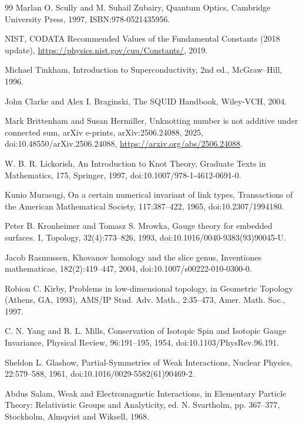 \begin{thebibliography}{99}
     Marlan O. Scully and M. Suhail Zubairy, Quantum Optics, Cambridge University Press, 1997, ISBN:978-0521435956.

     NIST, CODATA Recommended Values of the Fundamental Constants (2018 update), \url{https://physics.nist.gov/cuu/Constants/}, 2019.

     Michael Tinkham, Introduction to Superconductivity, 2nd ed., McGraw–Hill, 1996.

     John Clarke and Alex I. Braginski, The SQUID Handbook, Wiley-VCH, 2004.

     Mark Brittenham and Susan Hermiller, Unknotting number is not additive under connected sum, arXiv e-prints, arXiv:2506.24088, 2025, doi:10.48550/arXiv.2506.24088, \url{https://arxiv.org/abs/2506.24088}.

     W. B. R. Lickorish, An Introduction to Knot Theory, Graduate Texts in Mathematics, 175, Springer, 1997, doi:10.1007/978-1-4612-0691-0.

     Kunio Murasugi, On a certain numerical invariant of link types, Transactions of the American Mathematical Society, 117:387--422, 1965, doi:10.2307/1994180.

     Peter B. Kronheimer and Tomasz S. Mrowka, Gauge theory for embedded surfaces. I, Topology, 32(4):773--826, 1993, doi:10.1016/0040-9383(93)90045-U.

     Jacob Rasmussen, Khovanov homology and the slice genus, Inventiones mathematicae, 182(2):419--447, 2004, doi:10.1007/s00222-010-0300-0.

     Robion C. Kirby, Problems in low-dimensional topology, in Geometric Topology (Athens, GA, 1993), AMS/IP Stud. Adv. Math., 2:35--473, Amer. Math. Soc., 1997.

     C. N. Yang and R. L. Mills, Conservation of Isotopic Spin and Isotopic Gauge Invariance, Physical Review, 96:191--195, 1954, doi:10.1103/PhysRev.96.191.

     Sheldon L. Glashow, Partial-Symmetries of Weak Interactions, Nuclear Physics, 22:579--588, 1961, doi:10.1016/0029-5582(61)90469-2.

     Abdus Salam, Weak and Electromagnetic Interactions, in Elementary Particle Theory: Relativistic Groups and Analyticity, ed. N. Svartholm, pp. 367--377, Stockholm, Almqvist and Wiksell, 1968.


\end{thebibliography}
